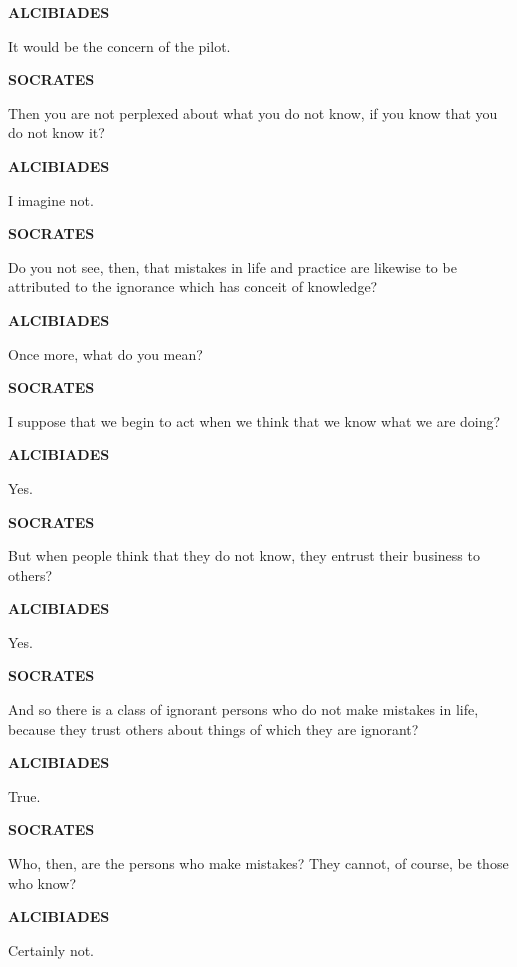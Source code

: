 \documentclass[11pt,letter]{article}
\begin{document}
\par \textbf{ALCIBIADES}
\par   It would be the concern of the pilot.

\par \textbf{SOCRATES}
\par   Then you are not perplexed about what you do not know, if you know that you do not know it?

\par \textbf{ALCIBIADES}
\par   I imagine not.

\par \textbf{SOCRATES}
\par   Do you not see, then, that mistakes in life and practice are likewise to be attributed to the ignorance which has conceit of knowledge?

\par \textbf{ALCIBIADES}
\par   Once more, what do you mean?

\par \textbf{SOCRATES}
\par   I suppose that we begin to act when we think that we know what we are doing?

\par \textbf{ALCIBIADES}
\par   Yes.

\par \textbf{SOCRATES}
\par   But when people think that they do not know, they entrust their business to others?

\par \textbf{ALCIBIADES}
\par   Yes.

\par \textbf{SOCRATES}
\par   And so there is a class of ignorant persons who do not make mistakes in life, because they trust others about things of which they are ignorant?

\par \textbf{ALCIBIADES}
\par   True.

\par \textbf{SOCRATES}
\par   Who, then, are the persons who make mistakes? They cannot, of course, be those who know?

\par \textbf{ALCIBIADES}
\par   Certainly not.
\end{document}
